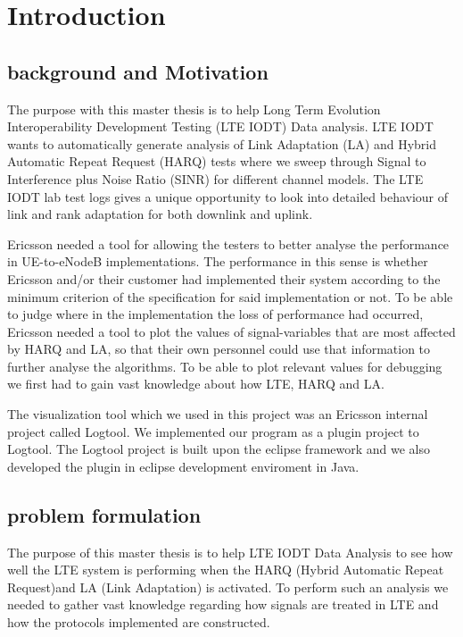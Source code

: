 \documentclass[cropmarks, frame, english]{idamasterthesis}
\author{Paul Nedstrand \& Razmus Lindgren}
\begin{document}

\makeintropages

\chapter{Introduction}

\section{background and Motivation}
The purpose with this master thesis is to help Long Term Evolution Interoperability Development Testing (LTE IODT) Data analysis. LTE IODT wants to automatically generate analysis of Link Adaptation (LA) and Hybrid Automatic Repeat Request (HARQ) tests where we sweep through Signal to Interference plus Noise Ratio (SINR) for different channel models. The LTE IODT lab test logs gives a unique opportunity to look into detailed behaviour of link and rank adaptation for both downlink and uplink. \newline


Ericsson needed a tool for allowing the testers to better analyse the performance in UE-to-eNodeB implementations. The performance in this sense is whether Ericsson and/or their customer had implemented their system according to the minimum criterion of the specification for said implementation or not. To be able to judge where in the implementation the loss of performance had occurred, Ericsson needed a tool to plot the values of signal-variables that are most affected by HARQ and LA, so that their own personnel could use that information to further analyse the algorithms. To be able to plot relevant values for debugging we first had to gain vast knowledge about how LTE, HARQ and LA. \newline


The visualization tool which we used in this project was an Ericsson internal project called Logtool. We implemented our program as a plugin project to Logtool. The Logtool project is built upon the eclipse framework and we also developed the plugin in eclipse development enviroment in Java. 





\section{problem formulation}
The purpose of this master thesis is to help LTE IODT Data Analysis to see how well the LTE system is performing when the HARQ (Hybrid Automatic Repeat Request)and LA (Link Adaptation) is activated. To perform such an analysis we needed to gather vast knowledge regarding how signals are treated in LTE and how the protocols implemented are constructed.
\end{document}
